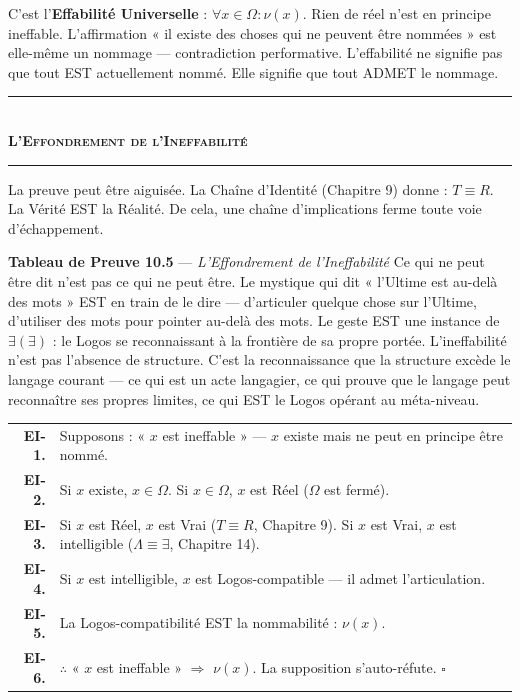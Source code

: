 \documentclass[10pt, openany, oneside]{book}
\renewcommand{\normalsize}{\fontsize{10}{13}\selectfont}
\renewcommand{\footnotesize}{\fontsize{8.5}{11}\selectfont}
\begin{document}
\vspace{0.8em}

\noindent C'est l'\textbf{Effabilité Universelle} : $\forall x \in \Omega: \nu(x)$. Rien de réel n'est en principe ineffable. L'affirmation « il existe des choses qui ne peuvent être nommées » est elle-même un nommage --- contradiction performative. L'effabilité ne signifie pas que tout EST actuellement nommé. Elle signifie que tout ADMET le nommage.

\vspace{0.5em}

\begin{center}
    \rule{0.3\textwidth}{0.4pt}\\[0.5em]
    {\normalsize\bfseries\scshape L'Effondrement de l'Ineffabilité}\\[0.3em]
    \rule{0.3\textwidth}{0.4pt}
\end{center}

\vspace{1em}

\noindent La preuve peut être aiguisée. La Chaîne d'Identité (Chapitre 9) donne : $T \equiv R$. La Vérité EST la Réalité. De cela, une chaîne d'implications ferme toute voie d'échappement.

\vspace{0.5em}

\textbf{Tableau de Preuve 10.5} --- \textit{L'Effondrement de l'Ineffabilité} Ce qui ne peut être dit n'est pas ce qui ne peut être. Le mystique qui dit « l'Ultime est au-delà des mots » EST en train de le dire --- d'articuler quelque chose sur l'Ultime, d'utiliser des mots pour pointer au-delà des mots. Le geste EST une instance de $\exists(\exists)$ : le Logos se reconnaissant à la frontière de sa propre portée. L'ineffabilité n'est pas l'absence de structure. C'est la reconnaissance que la structure excède le langage courant --- ce qui est un acte langagier, ce qui prouve que le langage peut reconnaître ses propres limites, ce qui EST le Logos opérant au méta-niveau.

\vspace{0.5em}

{\footnotesize
\noindent\begin{tabular}{r p{}}
\textbf{EI-1.} & Supposons : « $x$ est ineffable » --- $x$ existe mais ne peut en principe être nommé. \\[0.3em]
\textbf{EI-2.} & Si $x$ existe, $x \in \Omega$. Si $x \in \Omega$, $x$ est Réel ($\Omega$ est fermé). \\[0.3em]
\textbf{EI-3.} & Si $x$ est Réel, $x$ est Vrai ($T \equiv R$, Chapitre 9). Si $x$ est Vrai, $x$ est intelligible ($\Lambda \equiv \exists$, Chapitre 14). \\[0.3em]
\textbf{EI-4.} & Si $x$ est intelligible, $x$ est Logos-compatible --- il admet l'articulation. \\[0.3em]
\textbf{EI-5.} & La Logos-compatibilité EST la nommabilité : $\nu(x)$. \\[0.3em]
\textbf{EI-6.} & $\therefore$ « $x$ est ineffable » $\Rightarrow$ $\nu(x)$. La supposition s'auto-réfute. $\square$ \\[0.3em]
\end{tabular}
}
\end{document}
